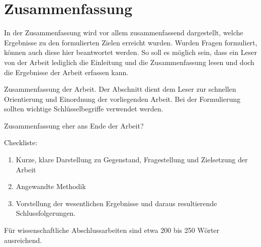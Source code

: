 \chapter*{Zusammenfassung}
In der Zusammenfassung wird vor allem zusammenfassend dargestellt, welche Ergebnisse zu den formulierten Zielen erreicht wurden. Wurden Fragen formuliert, können auch diese hier beantwortet werden. So soll es möglich sein, dass ein Leser von der Arbeit lediglich die Einleitung und die Zusammenfassung lesen und doch die Ergebnisse der Arbeit erfassen kann.

Zusammenfassung der Arbeit. Der Abschnitt dient dem Leser zur schnellen Orientierung und Einordnung der vorliegenden Arbeit. Bei der Formulierung sollten wichtige Schlüsselbegriffe verwendet werden.

Zusammenfassung eher ans Ende der Arbeit?

Checkliste:
\begin{enumerate}
\item Kurze, klare Darstellung zu Gegenstand, Fragestellung und Zielsetzung der Arbeit
\item Angewandte Methodik
\item Vorstellung der wesentlichen Ergebnisse und daraus resultierende Schlussfolgerungen.
\end{enumerate}
Für wissenschaftliche Abschlussarbeiten sind etwa 200 bis 250 Wörter ausreichend.


\vfill
